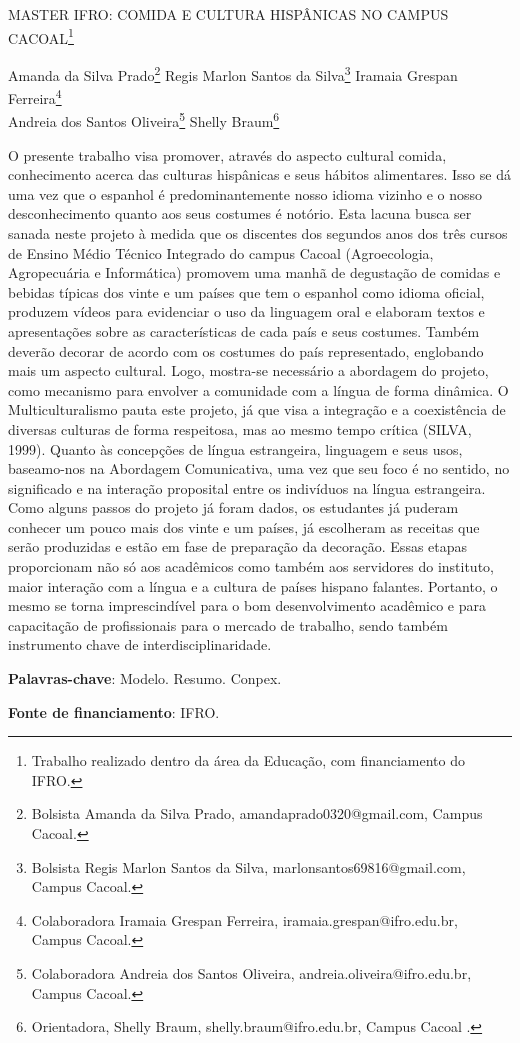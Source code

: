 \documentclass[article,12pt,onesidea,4paper,english,brazil]{abntex2}
\begin{document}
	
	
	\frenchspacing 
	
	\begin{center}
		\LARGE MASTER IFRO: COMIDA E CULTURA HISPÂNICAS NO CAMPUS CACOAL\footnote{Trabalho realizado dentro da área da Educação, com financiamento do IFRO.}
		
		\normalsize
		Amanda da Silva Prado\footnote{Bolsista Amanda da Silva Prado, amandaprado0320@gmail.com, Campus Cacoal.} 
	Regis Marlon Santos da Silva\footnote{Bolsista Regis Marlon Santos da Silva, marlonsantos69816@gmail.com, Campus Cacoal.} 
	Iramaia Grespan Ferreira\footnote{Colaboradora Iramaia Grespan Ferreira, iramaia.grespan@ifro.edu.br, Campus Cacoal.} \\
	Andreia dos Santos Oliveira\footnote{Colaboradora Andreia dos Santos Oliveira, andreia.oliveira@ifro.edu.br, Campus Cacoal.} 
	Shelly Braum\footnote{Orientadora, Shelly Braum, shelly.braum@ifro.edu.br, Campus Cacoal .} 
	\end{center}
	
	\noindent O presente trabalho visa promover, através do aspecto cultural comida, conhecimento acerca das
	culturas hispânicas e seus hábitos alimentares. Isso se dá uma vez que o espanhol é
	predominantemente nosso idioma vizinho e o nosso desconhecimento quanto aos seus costumes é
	notório. Esta lacuna busca ser sanada neste projeto à medida que os discentes dos segundos anos
	dos três cursos de Ensino Médio Técnico Integrado do campus Cacoal (Agroecologia, Agropecuária e
	Informática) promovem uma manhã de degustação de comidas e bebidas típicas dos vinte e um
	países que tem o espanhol como idioma oficial, produzem vídeos para evidenciar o uso da linguagem
	oral e elaboram textos e apresentações sobre as características de cada país e seus costumes.
	Também deverão decorar de acordo com os costumes do país representado, englobando mais um
	aspecto cultural. Logo, mostra-se necessário a abordagem do projeto, como mecanismo para
	envolver a comunidade com a língua de forma dinâmica. O Multiculturalismo pauta este projeto, já
	que visa a integração e a coexistência de diversas culturas de forma respeitosa, mas ao mesmo
	tempo crítica (SILVA, 1999). Quanto às concepções de língua estrangeira, linguagem e seus usos,
	baseamo-nos na Abordagem Comunicativa, uma vez que seu foco é no sentido, no significado e na
	interação proposital entre os indivíduos na língua estrangeira. Como alguns passos do projeto já
	foram dados, os estudantes já puderam conhecer um pouco mais dos vinte e um países, já
	escolheram as receitas que serão produzidas e estão em fase de preparação da decoração. Essas
	etapas proporcionam não só aos acadêmicos como também aos servidores do instituto, maior
	interação com a língua e a cultura de países hispano falantes. Portanto, o mesmo se torna
	imprescindível para o bom desenvolvimento acadêmico e para capacitação de profissionais para o
	mercado de trabalho, sendo também instrumento chave de interdisciplinaridade.
	
	\vspace{\onelineskip}
	
	\noindent
	\textbf{Palavras-chave}: Modelo. Resumo. Conpex.
	
	\noindent
	\textbf{Fonte de financiamento}: IFRO.
	
\end{document}

